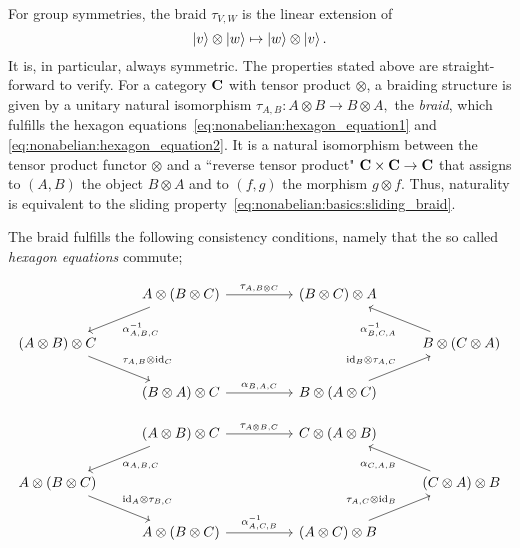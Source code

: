 \begin{doublecol}
    For group symmetries, the braid $\tau_{V, W}$ is the linear extension of $$\ket{v} \otimes \ket{w} \mapsto \ket{w} \otimes \ket{v}.$$
    It is, in particular, always symmetric.
    The properties stated above are straight-forward to verify.
\colswitch
    For a category $\mathbf{C}$ with tensor product $\otimes$, a braiding structure is given by a unitary natural isomorphism $\tau_{A,B} : A \otimes B \to B \otimes A,$ the \emph{braid}, which fulfills the hexagon equations~\eqref{eq:nonabelian:hexagon_equation1} and \eqref{eq:nonabelian:hexagon_equation2}.
    It is a natural isomorphism between the tensor product functor $\otimes$ and a ``reverse tensor product" $\mathbf{C} \times\mathbf{C} \to \mathbf{C}$ that assigns to $(A, B)$ the object $B \otimes A$ and to $(f, g)$ the morphism $g \otimes f$.
    Thus, naturality is equivalent to the sliding property~\eqref{eq:nonabelian:basics:sliding_braid}.
\end{doublecol}
\begin{extendrightcol}

    The braid fulfills the following consistency conditions, namely that the so called \emph{hexagon equations} commute;

    \begin{equation}
    \label{eq:nonabelian:hexagon_equation1}
    \begin{tikzcd}[ampersand replacement=\&]
        \&
        A \otimes (B \otimes C)
            \arrow[rr, "\tau_{A,B \otimes C}"]
            \arrow[dl, "\alpha_{A,B,C}^{-1}"]
        \& \&
        (B \otimes C) \otimes A
        \& \\
        (A \otimes B) \otimes C
            \arrow[dr, "\tau_{A,B} \otimes \id{C}"]
        \& \& \& \&
        B \otimes (C \otimes A)
            \arrow[ul, "\alpha_{B,C,A}^{-1}"]
        \\ \&
        (B \otimes A) \otimes C
            \arrow[rr, "\alpha_{B,A,C}"]
        \& \&
        B \otimes (A \otimes C)
            \arrow[ur, "\id{B} \otimes \tau_{A,C}"]
        \& 
    \end{tikzcd}
    \end{equation}
    
    \begin{equation}
    \label{eq:nonabelian:hexagon_equation2}
    \begin{tikzcd}[ampersand replacement=\&]
        \&
        (A \otimes B) \otimes C
            \arrow[rr, "\tau_{A\otimes B, C}"]
            \arrow[dl, "\alpha_{A,B,C}"]
        \& \&
        C \otimes (A \otimes B)
        \& \\
        A \otimes (B \otimes C)
            \arrow[dr, "\id{A} \otimes \tau_{B,C}"]
        \& \& \& \&
        (C \otimes A) \otimes B
            \arrow[ul, "\alpha_{C,A,B}"]
        \\ \&
        A \otimes (B \otimes C)
            \arrow[rr, "\alpha_{A,C,B}^{-1}"]
        \& \&
        (A \otimes C) \otimes B
            \arrow[ur, "\tau_{A,C} \otimes \id{B}"]
        \& 
    \end{tikzcd}
    \end{equation}
\end{extendrightcol}

